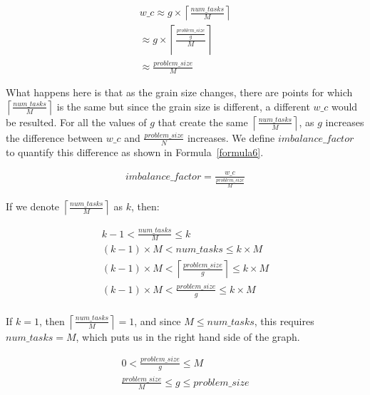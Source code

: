 \begin{equation}\label{formula6}
\begin{aligned}
w\_c\approx{g\times\left \lceil{\frac{num\_{tasks}}{M}}\right \rceil}\\
\approx{g\times\left \lceil{\frac{\frac{problem\_{size}}{g}}{M}}\right \rceil}\\
\approx{\frac{problem\_{size}}{M}}
\end{aligned}
\end{equation}

What happens here is that as the grain size changes, there are points for which $\left \lceil{\frac{num\_{tasks}}{M}}\right \rceil$ is the same but since the grain size is different, a different $w\_c$ would be resulted. 
For all the values of $g$ that create the same $\left \lceil{\frac{num\_{tasks}}{M}}\right \rceil$, as $g$ increases the difference between $w\_c$ and $\frac{problem\_{size}}{N}$ increases. We define $imbalance\_{factor}$ to quantify this difference as shown in Formula~\ref{formula6}.

\begin{equation}\label{formula7}
\begin{aligned}
imbalance\_{factor}=\frac{w\_c}{\frac{problem\_{size}}{M}}
\end{aligned}
\end{equation}

If we denote $\left \lceil{\frac{num\_{tasks}}{M}}\right \rceil$ as $k$, then:


\begin{equation}\label{formula8}
\begin{aligned}
k-1<{\frac{num\_{tasks}}{M}}\leq{k}\\
(k-1)\times{M}<num\_{tasks}\leq{k}\times{M}\\
(k-1)\times{M}<\left \lceil{\frac{problem\_{size}}{g}}\right \rceil\leq{k}\times{M}\\
(k-1)\times{M}<\frac{problem\_{size}}{g}\leq{{k}\times{M}}\\
\end{aligned}
\end{equation}

If $k=1$, then $\left \lceil{\frac{num\_{tasks}}{M}}\right \rceil=1$, and since $M\leq{num\_{tasks}}$, this requires ${num\_{tasks}}=M$, which puts us in the right hand side of the graph. 

\begin{equation}\label{formula9}
\begin{aligned}
0<\frac{problem\_{size}}{g}\leq{M}\\
\frac{problem\_{size}}{M}\leq{g}\leq{problem\_{size}}
\end{aligned}
\end{equation}


